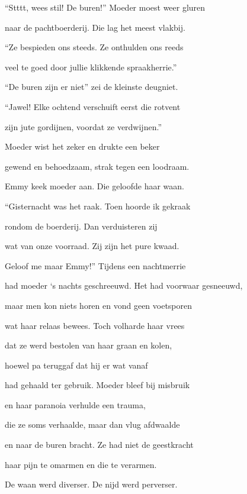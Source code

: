“Stttt, wees stil! De buren!”
Moeder moest weer gluren

naar de pachtboerderij.
Die lag het meest vlakbij.

“Ze bespieden ons steeds.
Ze onthulden ons reeds

veel te goed door jullie
klikkende spraakherrie.”

“De buren zijn er niet”
zei de kleinste deugniet.

“Jawel! Elke ochtend
verschuift eerst die rotvent

zijn jute gordijnen,
voordat ze verdwijnen.”

Moeder wist het zeker
en drukte een beker

gewend en behoedzaam,
strak tegen een loodraam.

Emmy keek moeder aan.
Die geloofde haar waan.

“Gisternacht was het raak.
Toen hoorde ik gekraak

rondom de boerderij.
Dan verduisteren zij

wat van onze voorraad.
Zij zijn het pure kwaad.

Geloof me maar Emmy!”
Tijdens een nachtmerrie

had moeder ‘s nachts geschreeuwd.
Het had voorwaar gesneeuwd,

maar men kon niets horen
en vond geen voetsporen

wat haar relaas bewees.
Toch volharde haar vrees

dat ze werd bestolen
van haar graan en kolen,

hoewel pa teruggaf
dat hij er wat vanaf

had gehaald ter gebruik.
Moeder bleef bij misbruik

en haar paranoia
verhulde een trauma,

die ze soms verhaalde,
maar dan vlug afdwaalde

en naar de buren bracht.
Ze had niet de geestkracht

haar pijn te omarmen
en die te verarmen.

De waan werd diverser.
De nijd werd perverser.
